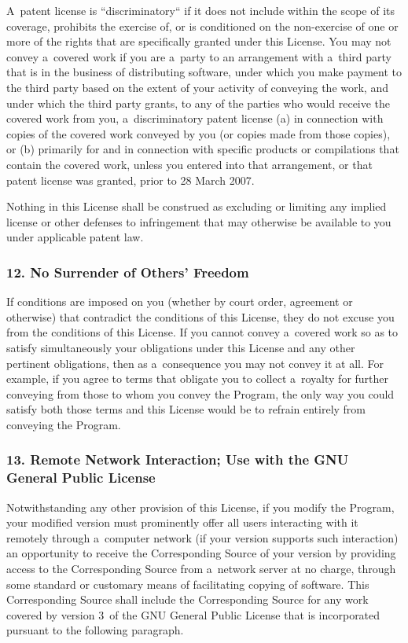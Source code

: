 \documentclass[a4paper, 11pt, twoside]{article}
\begin{document}
A~patent license is “discriminatory“ if it does not include within the scope of its coverage, prohibits the exercise of, or is conditioned on the non-exercise of one or more of the rights that are specifically granted under this License. You may not convey a~covered work if you are a~party to an arrangement with a~third party that is in the business of distributing software, under which you make payment to the third party based on the extent of your activity of conveying the work, and under which the third party grants, to any of the parties who would receive the covered work from you, a~discriminatory patent license (a) in connection with copies of the covered work conveyed by you (or copies made from those copies), or (b) primarily for and in connection with specific products or compilations that contain the covered work, unless you entered into that arrangement, or that patent license was granted, prior to 28 March 2007.

Nothing in this License shall be construed as excluding or limiting any implied license or other defenses to infringement that may otherwise be available to you under applicable patent law.

\subsubsection{12. No Surrender of Others' Freedom}

If conditions are imposed on you (whether by court order, agreement or otherwise) that contradict the conditions of this License, they do not excuse you from the conditions of this License. If you cannot convey a~covered work so as to satisfy simultaneously your obligations under this License and any other pertinent obligations, then as a~consequence you may not convey it at all. For example, if you agree to terms that obligate you to collect a~royalty for further conveying from those to whom you convey the Program, the only way you could satisfy both those terms and this License would be to refrain entirely from conveying the Program.

\subsubsection{13. Remote Network Interaction; Use with the GNU General Public License}

Notwithstanding any other provision of this License, if you modify the Program, your modified version must prominently offer all users interacting with it remotely through a~computer network (if your version supports such interaction) an opportunity to receive the Corresponding Source of your version by providing access to the Corresponding Source from a~network server at no charge, through some standard or customary means of facilitating copying of software. This Corresponding Source shall include the Corresponding Source for any work covered by version 3~of the GNU General Public License that is incorporated pursuant to the following paragraph.
\end{document}
